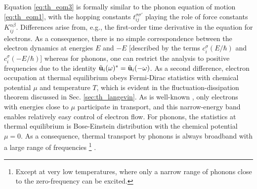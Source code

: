 Equation \eqref{eq:th_eom3} is formally similar to the phonon equation of motion \eqref{eq:th_eom1}, with the hopping constants $t_{ij}^{\sigma\sigma'}$ playing the role of force constants $K_{ij}^{\alpha\beta}$. Differences arise from, e.g., the first-order time derivative in the equation for electrons. As a consequence, there is no simple correspondence between the electron dynamics at energies $E$ and $-E$ [described by the terms $c_i^{\sigma}(E/\hbar)$ and $c_i^{\sigma}(-E/\hbar)$] whereas for phonons, one can restrict the analysis to positive frequencies due to the identity $\tilde{\mathbf{u}}_i(\omega)^*=\tilde{\mathbf{u}}_i(-\omega)$. As a second difference, electron occupation at thermal equilibrium obeys Fermi-Dirac statistics with chemical potential $\mu$ and temperature $T$, which is evident in the fluctuation-dissipation theorem discussed in Sec. \ref{sec:th_langevin}. As is well-known \cite{ashcroftmermin}, only electrons with energies close to $\mu$ participate in transport, and this narrow-energy band enables relatively easy control of electron flow. For phonons, the statistics at thermal equilibrium is Bose-Einstein distribution with the chemical potential $\mu=0$. As a consequence, thermal transport by phonons is always broadband with a large range of frequencies \footnote{Except at very low temperatures, where only a narrow range of phonons close to the zero-frequency can be excited.} \cite{ziman}. %







